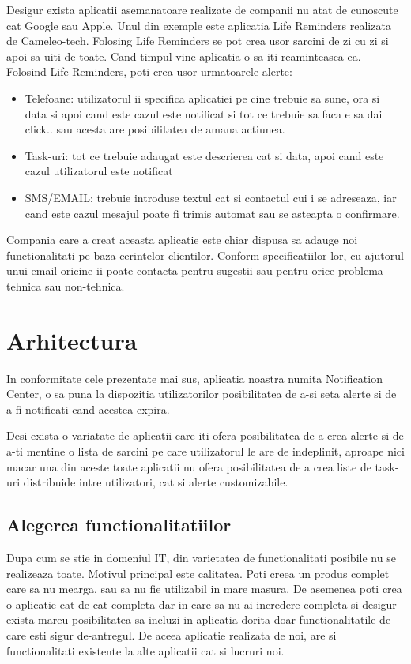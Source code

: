 \documentclass[conference]{IEEEtran}
\begin{document}
Desigur exista aplicatii asemanatoare realizate de companii nu atat de cunoscute cat Google sau Apple. Unul din exemple este aplicatia Life Reminders realizata de Cameleo-tech. Folosing Life Reminders se pot crea usor sarcini de zi cu zi si apoi sa uiti de toate. Cand timpul vine aplicatia o sa iti reaminteasca ea. Folosind Life Reminders, poti crea usor urmatoarele alerte:
\begin{itemize}
  \item Telefoane: utilizatorul ii specifica aplicatiei pe cine trebuie sa sune, ora si data si apoi cand este cazul este notificat si tot ce trebuie sa faca e sa dai click.. sau acesta are posibilitatea de amana actiunea. 
  \item Task-uri: tot ce trebuie adaugat este descrierea cat si data, apoi cand este cazul utilizatorul este notificat
  \item SMS/EMAIL: trebuie introduse textul cat si contactul cui i se adreseaza, iar cand este cazul mesajul poate fi trimis automat sau se asteapta o confirmare.
\end{itemize}
Compania care a creat aceasta aplicatie este chiar dispusa sa adauge noi functionalitati pe baza cerintelor clientilor. Conform specificatiilor lor, cu ajutorul unui email oricine ii poate contacta pentru  sugestii sau pentru orice problema tehnica sau non-tehnica.

\section{Arhitectura}


In conformitate cele prezentate mai sus, aplicatia noastra numita Notification Center, o sa puna la dispozitia utilizatorilor posibilitatea de a-si seta alerte si de a fi notificati cand acestea expira.

Desi exista o variatate de aplicatii care iti ofera posibilitatea de a crea alerte si de a-ti mentine o lista de sarcini pe care utilizatorul le are de indeplinit, aproape nici macar una din aceste toate aplicatii nu ofera posibilitatea de a crea liste de task-uri distribuide intre utilizatori, cat si alerte customizabile.

\subsection{Alegerea functionalitatiilor}
Dupa cum se stie in domeniul IT, din varietatea de functionalitati posibile nu se realizeaza toate. Motivul principal este calitatea. Poti creea un produs complet care sa nu mearga, sau sa nu fie utilizabil in mare masura. De asemenea poti crea o aplicatie cat de cat completa dar in care sa nu ai incredere completa si desigur exista mareu posibilitatea sa incluzi in aplicatia dorita doar functionalitatile de care esti sigur de-antregul. De aceea aplicatie realizata de noi, are si functionalitati existente la alte aplicatii cat si lucruri noi.
\end{document}
